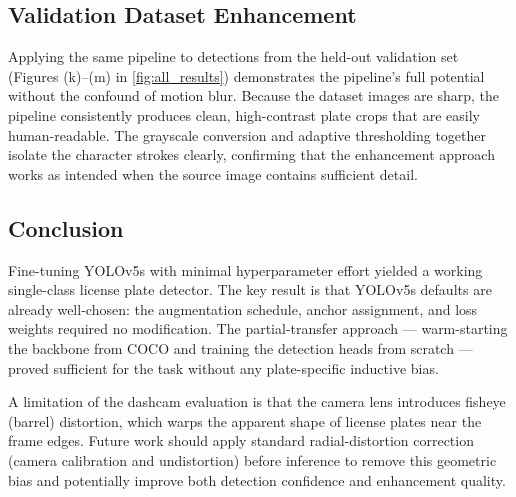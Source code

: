 \documentclass[times,10pt,twocolumn]{article}
\begin{document}
\subsection{Validation Dataset Enhancement}
\label{sec:val_enhancement}

Applying the same pipeline to detections from the held-out validation set (Figures (k)--(m) in \cref{fig:all_results}) demonstrates the pipeline's full potential without the confound of motion blur. Because the dataset images are sharp, the pipeline consistently produces clean, high-contrast plate crops that are easily human-readable. The grayscale conversion and adaptive thresholding together isolate the character strokes clearly, confirming that the enhancement approach works as intended when the source image contains sufficient detail.

\subsection{Conclusion}
Fine-tuning YOLOv5s with minimal hyperparameter effort yielded a
working single-class license plate detector. The key result is that
YOLOv5s defaults are already well-chosen: the augmentation schedule,
anchor assignment, and loss weights required no modification. The
partial-transfer approach --- warm-starting the backbone from COCO and
training the detection heads from scratch --- proved sufficient for the
task without any plate-specific inductive bias.


A  limitation of the dashcam evaluation is that the camera
lens introduces fisheye (barrel) distortion, which warps the apparent
shape of license plates near the frame edges. Future work should apply
standard radial-distortion correction (camera calibration and
undistortion) before inference to remove this geometric bias and
potentially improve both detection confidence and enhancement quality.
\end{document}
